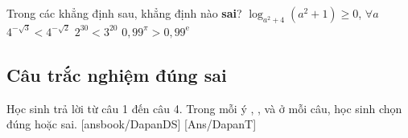 \begin{ex}%
	Trong các khẳng định sau, khẳng định nào \textbf{sai}?
	\choice
	{$\log _{a^2+4}\left(a^2+1\right) \ge 0$, $\forall a$}
	{$4^{-\sqrt{3}}<4^{-\sqrt{2}}$}
	{$2^{30}<3^{20}$}
	{\True $0{,}99^{\pi}>0{,}99^{\mathrm{e}}$}
\end{ex}


\subsection{Câu trắc nghiệm đúng sai}
Học sinh trả lời từ câu 1 đến câu 4.
Trong mỗi ý , ,  và  ở mỗi câu, học sinh chọn đúng hoặc sai.
\setcounter{ex}{0}
\LGexTF
{}[ansbook/DapanDS]
[Ans/DapanT]


